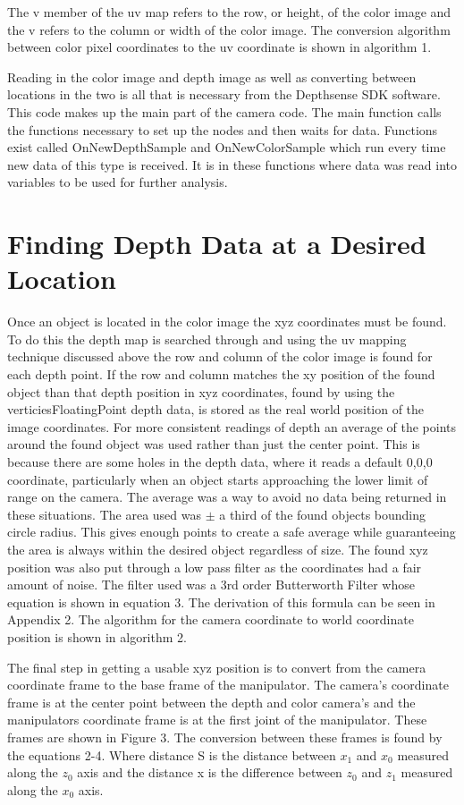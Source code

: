 \documentclass[letterpaper,12pt]{report}
\begin{document}
The v member of the uv map refers to the row, or height, of the color image and the v refers to the column or width of the color image. The conversion algorithm between color pixel coordinates to the uv coordinate is shown in algorithm 1.
 
Reading in the color image and depth image as well as converting between locations in the two is all that is necessary from the Depthsense SDK software. This code makes up the main part of the camera code. The main function calls the functions necessary to set up the nodes and then waits for data. Functions exist called OnNewDepthSample and OnNewColorSample which run every time new data of this type is received. It is in these functions where data was read into variables to be used for further analysis.

\section{Finding Depth Data at a Desired Location}
Once an object is located in the color image the xyz coordinates must be found. To do this the depth map is searched through and using the uv mapping technique discussed above the row and column of the color image is found for each depth point. If the row and column matches the xy position of the found object than that depth position in xyz coordinates, found by using the verticiesFloatingPoint depth data, is stored as the real world position of the image coordinates. For more consistent readings of depth an average of the points around the found object was used rather than just the center point. This is because there are some holes in the depth data, where it reads a default 0,0,0 coordinate, particularly when an object starts approaching the lower limit of range on the camera. The average was a way to avoid no data being returned in these situations. The area used was $\pm$ a third of the found objects bounding circle radius. This gives enough points to create a safe average while guaranteeing the area is always within the desired object regardless of size. The found xyz position was also put through a low pass filter as the coordinates had a fair amount of noise. The filter used was a 3rd order Butterworth Filter whose equation is shown in equation 3. The derivation of this formula can be seen in Appendix 2. The algorithm for the camera coordinate to world coordinate position is shown in algorithm 2.

The final step in getting a usable xyz position is to convert from the camera coordinate frame to the base frame of the manipulator. The camera's coordinate frame is at the center point between the depth and color camera's and the manipulators coordinate frame is at the first joint of the manipulator. These frames are shown in Figure 3. The conversion between these frames is found by the equations 2-4. Where distance S is the distance between $x_1$ and $x_0$ measured along the $z_0$ axis and the distance x is the difference between $z_0$ and $z_1$ measured along the $x_0$ axis. 
\end{document}
